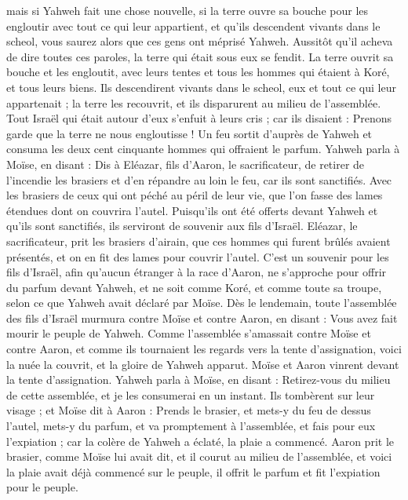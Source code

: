 \begin{multicols}{2}
mais si Yahweh fait une chose nouvelle, si la terre ouvre sa bouche pour les engloutir avec tout ce qui leur appartient, et qu'ils descendent vivants dans le scheol, vous saurez alors que ces gens ont méprisé Yahweh.
Aussitôt qu'il acheva de dire toutes ces paroles, la terre qui était sous eux se fendit.
La terre ouvrit sa bouche et les engloutit, avec leurs tentes et tous les hommes qui étaient à Koré, et tous leurs biens.
Ils descendirent vivants dans le scheol, eux et tout ce qui leur appartenait ; la terre les recouvrit, et ils disparurent au milieu de l'assemblée.
Tout Israël qui était autour d'eux s'enfuit à leurs cris ; car ils disaient : Prenons garde que la terre ne nous engloutisse !
Un feu sortit d’auprès de Yahweh et consuma les deux cent cinquante hommes qui offraient le parfum.
Yahweh parla à Moïse, en disant :
Dis à Eléazar, fils d'Aaron, le sacrificateur, de retirer de l’incendie les brasiers et d’en répandre au loin le feu, car ils sont sanctifiés.
Avec les brasiers de ceux qui ont péché au péril de leur vie, que l'on fasse des lames étendues dont on couvrira l'autel. Puisqu'ils ont été offerts devant Yahweh et qu’ils sont sanctifiés, ils serviront de souvenir aux fils d'Israël.
Eléazar, le sacrificateur, prit les brasiers d'airain, que ces hommes qui furent brûlés avaient présentés, et on en fit des lames pour couvrir l'autel.
C'est un souvenir pour les fils d'Israël, afin qu'aucun étranger à la race d'Aaron, ne s'approche pour offrir du parfum devant Yahweh, et ne soit comme Koré, et comme toute sa troupe, selon ce que Yahweh avait déclaré par Moïse.
Dès le lendemain, toute l'assemblée des fils d'Israël murmura contre Moïse et contre Aaron, en disant : Vous avez fait mourir le peuple de Yahweh.
Comme l'assemblée s'amassait contre Moïse et contre Aaron, et comme ils tournaient les regards vers la tente d'assignation, voici la nuée la couvrit, et la gloire de Yahweh apparut.
Moïse et Aaron vinrent devant la tente d'assignation.
Yahweh parla à Moïse, en disant :
Retirez-vous du milieu de cette assemblée, et je les consumerai en un instant. Ils tombèrent sur leur visage ;
et Moïse dit à Aaron : Prends le brasier, et mets-y du feu de dessus l'autel, mets-y du parfum, et va promptement à l'assemblée, et fais pour eux l’expiation ; car la colère de Yahweh a éclaté, la plaie a commencé.
Aaron prit le brasier, comme Moïse lui avait dit, et il courut au milieu de l'assemblée, et voici la plaie avait déjà commencé sur le peuple, il offrit le parfum et fit l’expiation pour le peuple.

\end{multicols}
